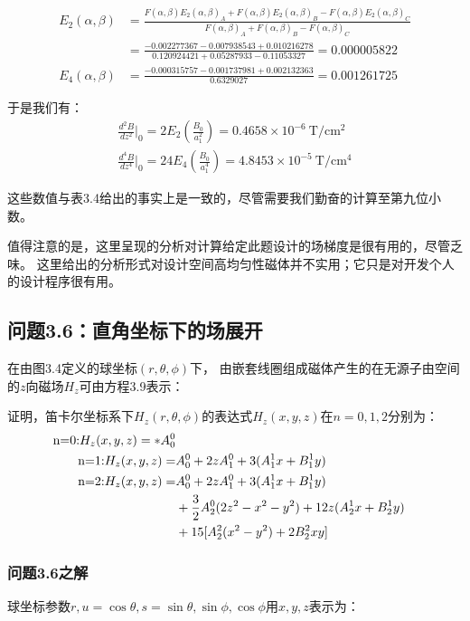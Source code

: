 \begin{align*}
E_2(\alpha,\beta)&=\frac{F(\alpha,\beta)E_2(\alpha,\beta)_A+F(\alpha,\beta)E_2(\alpha,\beta)_B-F(\alpha,\beta)E_2(\alpha,\beta)_C}{F(\alpha,\beta)_A+F(\alpha,\beta)_B-F(\alpha,\beta)_C}\\
&=\frac{-0.002277367-0.007938543+0.010216278}{0.120924421+0.05287933-0.11053327}=0.000005822\\
E_4(\alpha,\beta)&=\frac{-0.000315757-0.001737981+0.002132363}{0.6329027}=0.001261725
\end{align*}

于是我们有：
\begin{align*}%
\frac{d^2B}{dz^2}\big|_0=2E_2(\frac{B_0}{a_{1}^{2}})=0.4658\times 10^{-6}\ \mathrm{T/cm^2}\\
\frac{d^4B}{dz^4}\big|_0=24E_4(\frac{B_0}{a_{1}^{4}})=4.8453\times 10^{-5}\ \mathrm{T/cm^4}
\end{align*}

这些数值与表3.4给出的事实上是一致的，尽管需要我们勤奋的计算至第九位小数。

值得注意的是，这里呈现的分析对计算给定此题设计的场梯度是很有用的，尽管乏味。
这里给出的分析形式对设计空间高均匀性磁体并不实用；它只是对开发个人的设计程序很有用。



\subsection{问题3.6：直角坐标下的场展开}
在由图3.4定义的球坐标$(r, \theta,\phi)$下，
由嵌套线圈组成磁体产生的在无源子由空间的$z$向磁场$H_z$可由方程3.9表示：

证明，笛卡尔坐标系下$H_z(r, \theta,\phi)$的表达式$H_z(x, y, z)$在$n=0, 1, 2$分别为：
\begin{subequations}
	\begin{align}
\mbox{n=0:} H_z(x,y,z)=*A_{0}^{0}\\
\mbox{n=1:} H_z(x,y,z)=&A_{0}^{0}+2zA_{1}^{0}+3(A_{1}^{1}x+B_{1}^{1}y)\\
\mbox{n=2:} H_z(x,y,z)=&A_{0}^{0}+2zA_{1}^{0}+3(A_{1}^{1}x+B_{1}^{1}y)\notag\\
&+\frac{3}{2}A_{2}^{0}(2z^2-x^2-y^2)+12z(A_{2}^{1}x+B_{2}^{1}y)\notag\\
&+15[A_{2}^{2}(x^2-y^2)+2B_{2}^{2}xy]
	\end{align}
\end{subequations}


\subsubsection{问题3.6之解}
球坐标参数$r, u = \cos\theta, s = \sin\theta, \sin\phi,\cos\phi$用$x,y,z$表示为：

